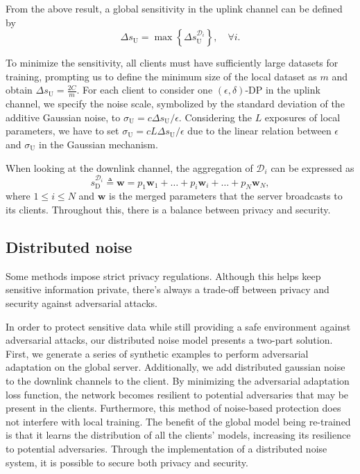 From the above result, a global sensitivity in the uplink channel can be defined by
\begin{equation}
\Delta s_{\text{U}}= \max\left\{\Delta s_{\text{U}}^{\mathcal D_i}\right\},\quad\forall i.
\end{equation}

To minimize the sensitivity, all clients must have sufficiently large datasets for training, prompting us to define the minimum size of the local dataset as $m$ and obtain $\Delta s_{\text{U}} = \frac{2C}{m}$.
For each client to consider one $(\epsilon, \delta)$-DP in the uplink channel, we specify the noise scale, symbolized by the standard deviation of the additive Gaussian noise, to $\sigma_{\text{U}}= c\Delta s_{\text{U}}/\epsilon$.
Considering the $L$ exposures of local parameters, we have to set $\sigma_{\text{U}}= cL\Delta s_{\text{U}}/\epsilon$ due to the linear relation between $\epsilon$ and $\sigma_{\text{U}}$ in the Gaussian mechanism. 




When looking at the downlink channel, the aggregation of $\mathcal D_i$ can be expressed as
\begin{equation}
\label{DLfunction}
s_{\text{D}}^{\mathcal D_i}\triangleq \mathbf{w}=p_1\mathbf{w}_{1}+\ldots+p_i\mathbf{w}_{i}+\ldots+p_N\mathbf{w}_{N},
\end{equation}
where $1\leq i\leq N$ and $\mathbf{w}$ is the merged parameters that the server broadcasts to its clients. Throughout this, there is a balance between privacy and security.

\subsection{Distributed noise}
Some methods impose strict privacy regulations. Although this helps keep sensitive information private, there's always a trade-off between privacy and security against adversarial attacks. 

 In order to protect sensitive data while still providing a safe environment against adversarial attacks, our distributed noise model presents a two-part solution. First, we generate a series of synthetic examples to perform adversarial adaptation on the global server. Additionally, we add distributed gaussian noise to the downlink channels to the client. By minimizing the adversarial adaptation loss function, the network becomes resilient to potential adversaries that may be present in the clients. Furthermore, this method of noise-based protection does not interfere with local training. The benefit of the global model being re-trained is that it learns the distribution of all the clients' models, increasing its resilience to potential adversaries. Through the implementation of a distributed noise system, it is possible to secure both privacy and security.



